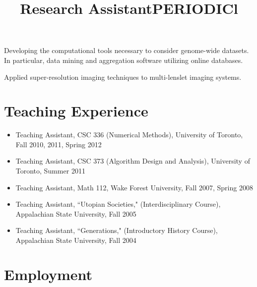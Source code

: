 \documentclass[overlapped,line,letterpaper]{res}
\begin{document}
\begin{resume}
\title{Research Assistant}
\begin{position}
Developing the computational tools necessary to consider genome-wide datasets.  In particular, data mining and aggregation software utilizing online databases.
\end{position}

\title{PERIODIC}
\begin{position}
Applied super-resolution imaging techniques to multi-lenslet imaging systems.
\end{position}


\section{\bf Teaching Experience}

\begin{itemize}
\item Teaching Assistant, CSC 336 (Numerical Methods), University of Toronto, Fall 2010, 2011, Spring 2012
\item Teaching Assistant, CSC 373 (Algorithm Design and Analysis), University of Toronto, Summer 2011
\item Teaching Assistant, Math 112, Wake Forest University, Fall 2007, Spring 2008
\item Teaching Assistant, ``Utopian Societies," (Interdisciplinary Course), Appalachian State University, Fall 2005
\item Teaching Assistant, ``Generations," (Introductory History Course), Appalachian State University, Fall 2004
\end{itemize}


\section{\bf Employment}
%
 \begin{format}
 \\
 \title{l}\\
 \body\\
 \end{format}
%


\end{resume}
\end{document}

